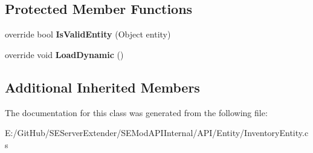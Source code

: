 \subsection*{Protected Member Functions}
\begin{DoxyCompactItemize}
\item 
\hypertarget{class_s_e_mod_a_p_i_internal_1_1_a_p_i_1_1_entity_1_1_inventory_item_manager_a1245a067054f9614cc7d9b4d27b91bb1}{}override bool {\bfseries Is\+Valid\+Entity} (Object entity)\label{class_s_e_mod_a_p_i_internal_1_1_a_p_i_1_1_entity_1_1_inventory_item_manager_a1245a067054f9614cc7d9b4d27b91bb1}

\item 
\hypertarget{class_s_e_mod_a_p_i_internal_1_1_a_p_i_1_1_entity_1_1_inventory_item_manager_a2ff2f731f7c33c0b6b8b3b534bf729d3}{}override void {\bfseries Load\+Dynamic} ()\label{class_s_e_mod_a_p_i_internal_1_1_a_p_i_1_1_entity_1_1_inventory_item_manager_a2ff2f731f7c33c0b6b8b3b534bf729d3}

\end{DoxyCompactItemize}
\subsection*{Additional Inherited Members}


The documentation for this class was generated from the following file\+:\begin{DoxyCompactItemize}
\item 
E\+:/\+Git\+Hub/\+S\+E\+Server\+Extender/\+S\+E\+Mod\+A\+P\+I\+Internal/\+A\+P\+I/\+Entity/Inventory\+Entity.\+cs\end{DoxyCompactItemize}
